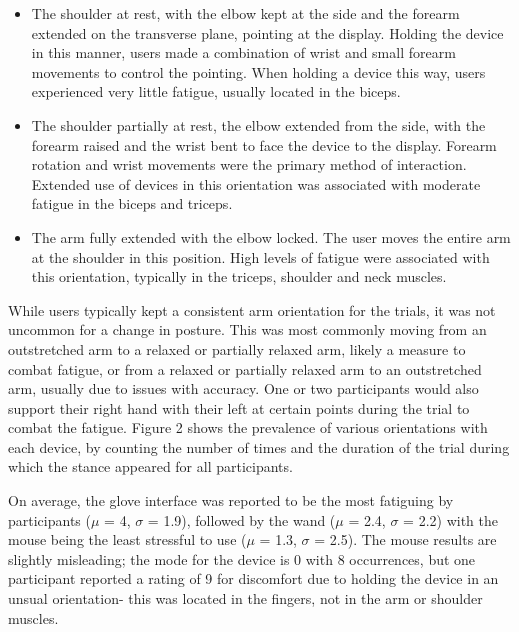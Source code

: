 \begin{itemize}
\item The shoulder at rest, with the elbow kept at the side and the forearm extended on the transverse plane, pointing at the display. Holding the device in this manner, users made a combination of wrist and small forearm movements to control the pointing. When holding a device this way, users experienced very little fatigue, usually located in the biceps. 
\item The shoulder partially at rest, the elbow extended from the side, with the forearm raised and the wrist bent to face the device to the display. Forearm rotation and wrist movements were the primary method of interaction. Extended use of devices in this orientation was associated with moderate fatigue in the biceps and triceps.
\item The arm fully extended with the elbow locked. The user moves the entire arm at the shoulder in this position. High levels of fatigue were associated with this orientation, typically in the triceps, shoulder and neck muscles.
\end{itemize}

While users typically kept a consistent arm orientation for the trials, it was not uncommon for a change in posture. This was most commonly moving from an outstretched arm to a relaxed or partially relaxed arm, likely a measure to combat fatigue, or from a relaxed or partially relaxed arm to an outstretched arm, usually due to issues with accuracy. One or two participants would also support their right hand with their left at certain points during the trial to combat the fatigue. Figure 2 shows the prevalence of various orientations with each device, by counting the number of times and the duration of the trial during which the stance appeared for all participants.

On average, the glove interface was reported to be the most fatiguing by participants ($\mu$ = 4, $\sigma$ = 1.9), followed by the wand ($\mu$ = 2.4, $\sigma$ = 2.2) with the mouse being the least stressful to use ($\mu$ = 1.3, $\sigma$ = 2.5). The mouse results are slightly misleading; the mode for the device is 0 with 8 occurrences,  but one participant reported a rating of 9 for discomfort due to holding the device in an unsual orientation- this was located in the fingers, not in the arm or shoulder muscles.

